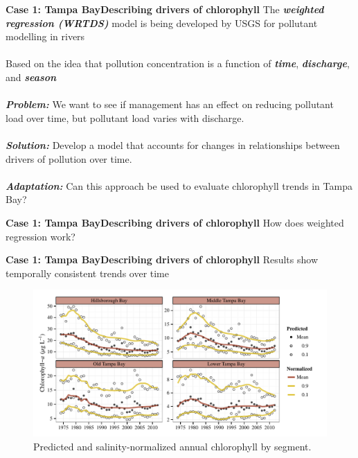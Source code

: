 \documentclass[serif]{beamer}\usepackage[]{graphicx}\usepackage[]{color}
\newcommand{\emtxt}[1]{\textbf{\textit{#1}}}
\begin{document}
\begin{frame}{\textbf{Case 1: Tampa Bay}}{\textbf{Describing drivers of chlorophyll}}
The \emtxt{weighted regression (WRTDS)} model is being developed by USGS for pollutant modelling in rivers \cite{Hirsch10}\\~\\
Based on the idea that pollution concentration is a function of \emtxt{time}, \emtxt{discharge}, and \emtxt{season}\\~\\
\emtxt{Problem:} We want to see if management has an effect on reducing pollutant load over time, but pollutant load varies with discharge.\\~\\
\emtxt{Solution:} Develop a model that accounts for changes in relationships between drivers of pollution over time.\\~\\
\emtxt{Adaptation:} Can this approach be used to evaluate chlorophyll trends in Tampa Bay?
\end{frame}



\begin{frame}{\textbf{Case 1: Tampa Bay}}{\textbf{Describing drivers of chlorophyll}}
How does weighted regression work?
\begin{center}
\end{center}
\end{frame}



\begin{frame}{\textbf{Case 1: Tampa Bay}}{\textbf{Describing drivers of chlorophyll}}
Results show temporally consistent trends over time
\begin{figure}
\centerline{\includegraphics[width = \textwidth]{fig/prdnrm.pdf}}
\caption{Predicted and salinity-normalized annual chlorophyll by segment.}
\end{figure}
\end{frame}
\end{document}
